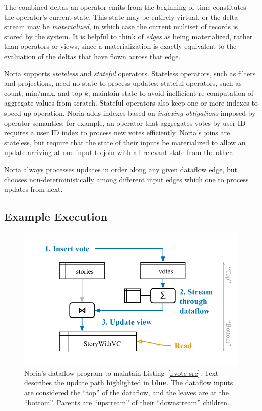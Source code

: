 The combined deltas an operator emits from the beginning of time constitutes the
operator's current state. This state may be entirely virtual, or the delta
stream may be \textit{materialized}, in which case the current multiset of
records is stored by the system. It is helpful to think of \emph{edges} as being
materialized, rather than operators or views, since a materialization is exactly
equivalent to the evaluation of the deltas that have flown across that edge.

Noria supports \emph{stateless} and \emph{stateful} operators. Stateless
operators, such as filters and projections, need no state to process updates;
stateful operators, such as count, min/max, and top-$k$, maintain state to avoid
inefficient re-computation of aggregate values from scratch. Stateful operators
also keep one or more indexes to speed up operation. Noria adds indexes based on
\emph{indexing obligations} imposed by operator semantics; for example, an
operator that aggregates votes by user ID requires a user ID index to process
new votes efficiently. Noria's joins are stateless, but require that the state
of their inputs be materialized to allow an update arriving at one input to join
with all relevant state from the other.

Noria always processes updates in order along any given dataflow edge, but
chooses non-deterministically among different input edges which one to process
updates from next.

\subsection*{Example Execution}

\begin{figure}[t]
  \centering
  \includegraphics{diagrams/Example Execution.pdf}
  \caption{Noria's dataflow program to maintain Listing~\ref{l:vote-src}. Text
  describes the update path highlighted in \textbf{\color{set1}blue}. The
  dataflow inputs are considered the ``top'' of the dataflow, and the leaves are
  at the ``bottom''. Parents are ``upstream'' of their ``downstream'' children.}
  \label{f:example-exec}
\end{figure}

